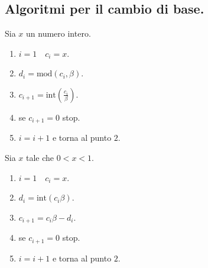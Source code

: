 \subsection{Algoritmi per il cambio di base.}
Sia $x$ un numero intero.
\begin{enumerate}
\item $i = 1 \quad c_i = x$.
\item $d_i = \mathrm{mod}(c_i, \beta)$.
\item $c_{i+1} = \mathrm{int}(\frac{c_i}{\beta})$.
\item se $c_{i+1} = 0$ stop.
\item $i = i+1$ e torna al punto $2$.
\end{enumerate}
Sia $x$ tale che $0 < x < 1$.
\begin{enumerate}
\item $i = 1 \quad c_i = x$.
\item $d_i = \mathrm{int}(c_i \beta)$.
\item $c_{i+1} = c_i\beta - d_i$.
\item se $c_{i+1} = 0$ stop.
\item $i = i+1$ e torna al punto $2$.
\end{enumerate}

